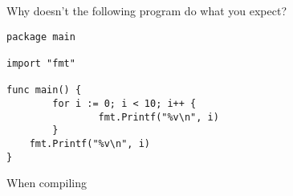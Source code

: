 \begin{Exercise}[title={Scope},difficulty=4]
\label{ex:scope}
\Question\label{ex:scope q1} Why doesn't the following program do
what you expect?

\begin{lstlisting}[caption=Scoping rules]
package main

import "fmt"
                                                                                                   
func main() {
        for i := 0; i < 10; i++ {
                fmt.Printf("%v\n", i)
        }
	fmt.Printf("%v\n", i)
}
\end{lstlisting}

\end{Exercise}

\begin{Answer}
\Question
When compiling


\end{Answer}
